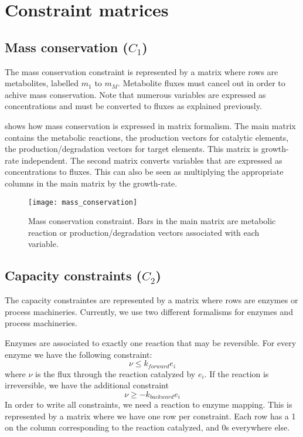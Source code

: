 
\section{Constraint matrices}

\subsection{Mass conservation ($C_1$)}

The mass conservation constraint is represented by a matrix where rows
are metabolites, labelled $m_1$ to $m_M$.
Metabolite fluxes must cancel out in order to achive mass conservation.
Note that numerous variables are expressed as concentrations and must be
converted to fluxes as explained previously.

 shows how mass conservation is expressed
in matrix formalism.
The main matrix contains the metabolic reactions,
the production vectors for catalytic elements,
the production/degradation vectors for target elements.
This matrix is growth-rate independent.
The second matrix converts variables that are expressed as
concentrations to fluxes.
This can also be seen as multiplying the appropriate columns in the main matrix
by the growth-rate.

\begin{figure}
  \centering
  \texttt{[image: mass\_conservation]}
  \caption{Mass conservation constraint.
  Bars in the main matrix are metabolic reaction or
  production/degradation vectors associated with each variable.}
  \label{fig:mass_conservation}
\end{figure}

\subsection{Capacity constraints ($C_2$)}

The capacity constraintes are represented by a matrix where rows are enzymes
or process machineries.
Currently, we use two different formalisms for enzymes and process machineries.

Enzymes are associated to exactly one reaction that may be reversible.
For every enzyme we have the following constraint:
\[
  \nu \leq k_{forward} e_i
\]
where $\nu$ is the flux through the reaction catalyzed by $e_i$.
If the reaction is irreversible, we have the additional constraint
\[
  \nu \geq -k_{backward} e_i
\]
In order to write all constraints, we need a reaction to enzyme mapping.
This is represented by a matrix where we have one row per constraint.
Each row has a 1 on the column corresponding to the reaction catalyzed,
and 0s everywhere else.

